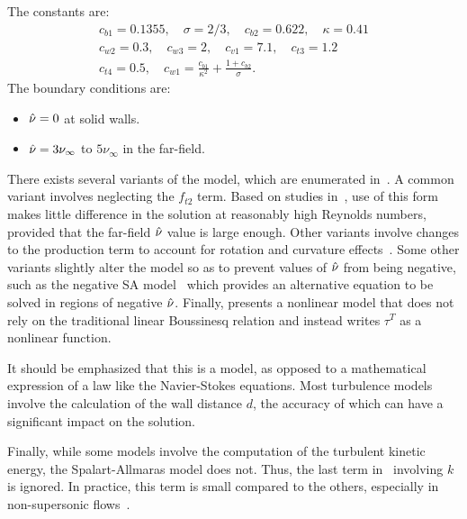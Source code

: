 The constants are:
\begin{gather*}
    c_{b1} = 0.1355, \quad \sigma = 2/3, \quad c_{b2} = 0.622, \quad \kappa = 0.41\\
    c_{w2} = 0.3, \quad c_{w3} = 2, \quad c_{v1} = 7.1, \quad c_{t3} = 1.2\\
    c_{t4} = 0.5, \quad c_{w1} = \frac{c_{b1}}{\kappa^2} + \frac{1 + c_{b2}}{\sigma}.
\end{gather*}
The boundary conditions are:
\begin{itemize}
    \item $\sa = 0$ at solid walls.
    \item $\sa = 3\nu_\infty$ to $5\nu_\infty$ in the far-field.
\end{itemize}
There exists several variants of the model, which are enumerated in~\cite{tmrsa}. A common variant involves neglecting the $f_{t2}$ term. Based on studies in~\cite{rumsey2007apparent}, use of this form makes little difference in the solution at reasonably high Reynolds numbers, provided that the far-field $\sa$ value is large enough. Other variants involve changes to the production term to account for rotation and curvature effects~\cite{shur2000turbulence,dacles1995numerical,dacles1999numerical}. Some other variants slightly alter the model so as to prevent values of $\sa$ from being negative, such as the negative SA model~\cite{allmaras2012modifications} which provides an alternative equation to be solved in regions of negative $\sa$. Finally, \cite{spalart2000strategies} presents a nonlinear model that does not rely on the traditional linear Boussinesq relation and instead writes $\tau^T$ as a nonlinear function.

It should be emphasized that this is a model, as opposed to a mathematical expression of a law like the Navier-Stokes equations. Most turbulence models involve the calculation of the wall distance $d$, the accuracy of which can have a significant impact on the solution.

Finally, while some models involve the computation of the turbulent kinetic energy, the Spalart-Allmaras model does not. Thus, the last term in~ involving $k$ is ignored. In practice, this term is small compared to the others, especially in non-supersonic flows~\cite{tmrsa}.

